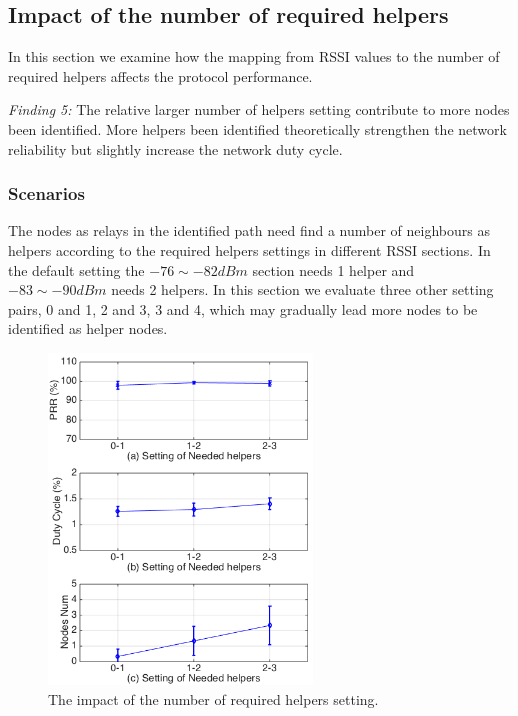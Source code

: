 \documentclass[conference]{IEEEtran}
\begin{document}
\subsection{Impact of the number of required helpers}
\label{sec:numhelpers}
In this section we examine how the mapping from RSSI values to the number of required helpers affects the protocol performance.

\emph{Finding 5:} 
The relative larger number of helpers setting contribute to more nodes been identified. More helpers been identified theoretically strengthen the network reliability but slightly increase the network duty cycle.
\subsubsection{Scenarios}
The nodes as relays in the identified path need find a number of neighbours as helpers according to the required helpers settings in different RSSI sections. In the default setting the $-76 \sim -82dBm$ section needs 1 helper and $-83\sim-90dBm$ needs 2 helpers. In this section we evaluate three other setting pairs, 0 and 1, 2 and 3, 3 and 4, which may gradually lead more nodes to be identified as helper nodes.
\begin{figure}
\centering
\includegraphics[width=7cm]{errorbar_numshelpers_ANS2.png}
\caption{The impact of the number of required helpers setting.}
\label{fig:testnumhelpers}
\end{figure}
\end{document}
